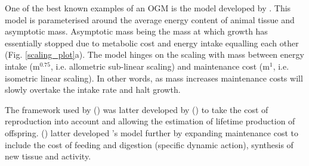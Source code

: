 \documentclass[a4paper, 11pt, hidelinks]{article} %
\begin{document}
	
%	

	One of the best known examples of an OGM is the model developed by \cite{West2001}.  This model is parameterised around the average energy content of animal tissue and asymptotic mass.  Asymptotic mass being the mass at which growth has essentially stopped due to metabolic cost and energy intake equalling each other (Fig. \ref{scaling_plot}a). The model hinges on the scaling with mass between energy intake (m$^{0.75}$, i.e. allometric sub-linear scaling) and maintenance cost (m$^1$, i.e. isometric linear scaling).  In other words, as mass increases maintenance costs will slowly overtake the intake rate and halt growth.  	
	
	The framework used by \citeauthor{West2001} (\citeyear{West2001}) was latter developed by \citeauthor{Charnov2001} (\citeyear{Charnov2001}) to take the cost of reproduction into account and allowing the estimation of lifetime production of offspring.  \citeauthor{Hou2008} (\citeyear{Hou2008}) latter developed \citeauthor{West2001}'s model further by expanding maintenance cost to include the cost of feeding and digestion (specific dynamic action), synthesis of new tissue and activity.
	
\end{document}
